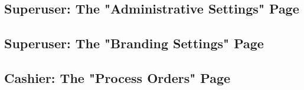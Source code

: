 \documentclass[12pt]{article}
\begin{document}
\subsection{Superuser: The "Administrative Settings" Page} 
\subsection{Superuser: The "Branding Settings" Page} 
\subsection{Cashier: The "Process Orders" Page}
\end{document}
